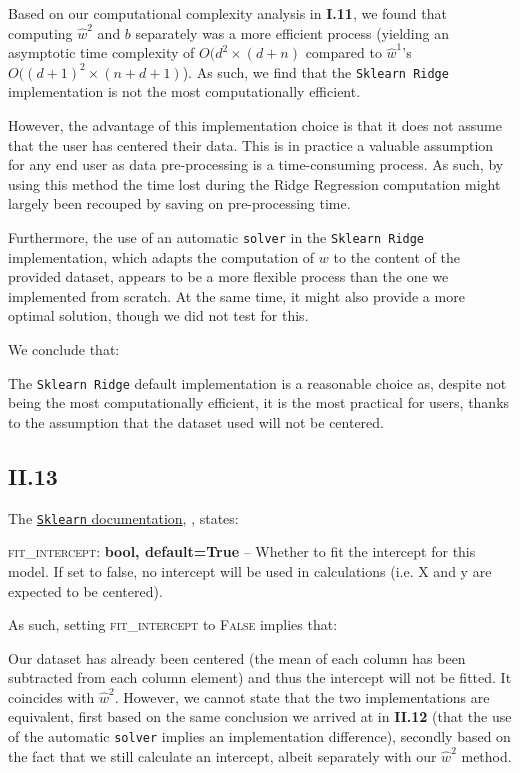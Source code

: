 \documentclass{homework}
\begin{document}
Based on our computational complexity analysis in \textbf{I.11}, we found that computing $\hat{w}^2$ and $b$ separately was a 
more efficient process (yielding an asymptotic time complexity of $O(d^2\times(d+n)$ compared to $\hat{w}^1$'s 
$O((d+1)^2\times(n+d+1)$). As such, we find that the \texttt{Sklearn Ridge} implementation is not the most computationally 
efficient. 

However, the advantage of this implementation choice is that it does not assume that the user has centered their data. 
This is in practice a valuable assumption for any end user as data pre-processing is a time-consuming process. As such, 
by using this method the time lost during the Ridge Regression computation might largely been recouped by saving on pre-processing time.

Furthermore, the use of an automatic \texttt{solver} in the \texttt{Sklearn Ridge} implementation, which adapts the computation of $w$ to
the content of the provided dataset, appears to be a more flexible process than the one we implemented from scratch. At the same time, it might 
also provide a more optimal solution, though we did not test for this.

We conclude that:

\textcolor{OliveGreen}{The \texttt{Sklearn Ridge} default implementation is a reasonable choice as, despite not being the
most computationally efficient, it is the most practical for users, thanks to the assumption that the dataset used will not be
centered.}

\subsection*{II.13} 

The \href{https://scikit-learn.org/stable/modules/generated/sklearn.linear_model.Ridge.html#sklearn.linear_model.Ridge}{\texttt{Sklearn} documentation}, 
\cite{sklearn_api}, states: 
\begin{displayquote}
\textsc{fit\_intercept}: \textbf{bool, default=True} -- Whether to fit the intercept for this model. If set to false, no intercept will be used in calculations (i.e. X and y are expected to be centered).
\end{displayquote}
As such, setting \textsc{fit\_intercept} to \textsc{False} implies that:

\textcolor{OliveGreen}{Our dataset has already been centered (the mean of each column has been subtracted 
from each column element) and thus the intercept will not be fitted. It coincides with $\hat{w}^2$. However, 
we cannot state that the two implementations are equivalent, first based on the same conclusion 
we arrived at in \textbf{II.12} (that the use of the automatic \texttt{solver} implies an implementation difference), 
secondly based on the fact that we still calculate an intercept, albeit separately with our $\hat{w}^2$ method}.
\end{document}
